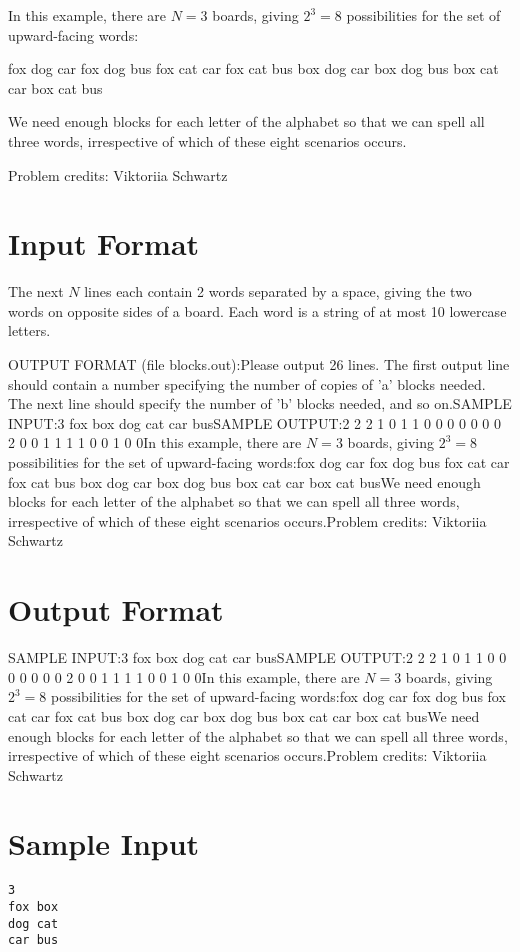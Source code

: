 \documentclass[12pt]{article}
\begin{document}
In this example, there are $N = 3$ boards, giving $2^3 = 8$ possibilities for
the set of upward-facing words:

fox dog car
fox dog bus
fox cat car
fox cat bus
box dog car
box dog bus
box cat car
box cat bus

We need enough blocks for each letter of the alphabet so that we can spell all
three words, irrespective of which of these eight scenarios occurs.


Problem credits: Viktoriia Schwartz



\section*{Input Format}
The next $N$ lines each contain 2 words separated by a space, giving the two
words on opposite sides of a board.  Each word is a string of at most 10
lowercase letters.

OUTPUT FORMAT (file blocks.out):Please output 26 lines. The first output line should contain a number specifying
the number of copies of 'a' blocks needed.  The next line should specify the
number of 'b' blocks needed, and so on.SAMPLE INPUT:3
fox box
dog cat
car busSAMPLE OUTPUT:2
2
2
1
0
1
1
0
0
0
0
0
0
0
2
0
0
1
1
1
1
0
0
1
0
0In this example, there are $N = 3$ boards, giving $2^3 = 8$ possibilities for
the set of upward-facing words:fox dog car
fox dog bus
fox cat car
fox cat bus
box dog car
box dog bus
box cat car
box cat busWe need enough blocks for each letter of the alphabet so that we can spell all
three words, irrespective of which of these eight scenarios occurs.Problem credits: Viktoriia Schwartz

\section*{Output Format}
SAMPLE INPUT:3
fox box
dog cat
car busSAMPLE OUTPUT:2
2
2
1
0
1
1
0
0
0
0
0
0
0
2
0
0
1
1
1
1
0
0
1
0
0In this example, there are $N = 3$ boards, giving $2^3 = 8$ possibilities for
the set of upward-facing words:fox dog car
fox dog bus
fox cat car
fox cat bus
box dog car
box dog bus
box cat car
box cat busWe need enough blocks for each letter of the alphabet so that we can spell all
three words, irrespective of which of these eight scenarios occurs.Problem credits: Viktoriia Schwartz

\section*{Sample Input}
\begin{verbatim}
3
fox box
dog cat
car bus
\end{verbatim}
\end{document}
